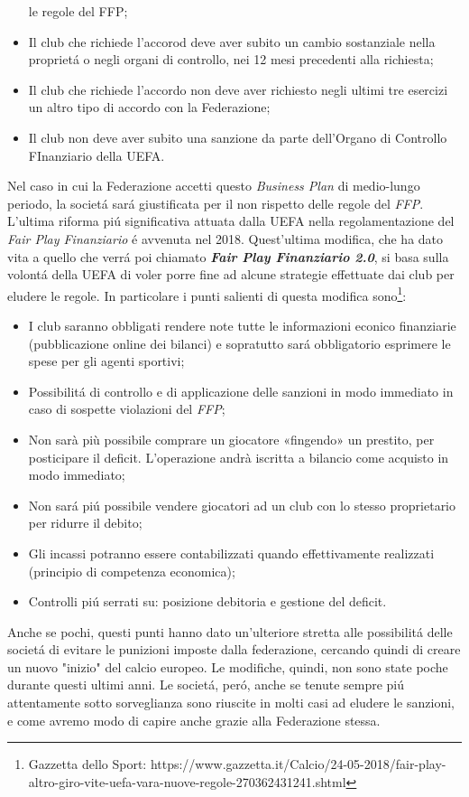 \documentclass[
    corpo=12pt,
    oneside,
    evenboxes,
    tipotesi=triennale,
    stile=classica,
    oldstyle,
    autoretitolo,
    greek,
]{toptesi}
\begin{document}
\begin{interlinea}{1.5}
\begin{itemize}
    le regole del FFP;
    \item Il club che richiede l'accorod deve aver subito un cambio sostanziale nella propriet\'a o negli organi di controllo, nei 12 mesi 
    precedenti alla richiesta;
    \item Il club che richiede l'accordo non deve aver richiesto negli ultimi tre esercizi un altro tipo di accordo con la Federazione;
    \item Il club non deve aver subito una sanzione da parte dell'Organo di Controllo FInanziario della UEFA.
\end{itemize}
Nel caso in cui la Federazione accetti questo \emph{Business Plan} di medio-lungo periodo, la societ\'a sar\'a giustificata per il non 
rispetto delle regole del \emph{FFP}.\newline
L'ultima riforma pi\'u significativa attuata dalla UEFA nella regolamentazione del \emph{Fair Play Finanziario} \'e avvenuta nel 2018.
Quest'ultima modifica, che ha dato vita a quello che verr\'a poi chiamato \emph{\textbf{Fair Play Finanziario 2.0}}, si basa sulla volont\'a della
UEFA di voler porre fine ad alcune strategie effettuate dai club per eludere le regole. In particolare i punti 
salienti di questa modifica sono\footnote{Gazzetta dello Sport: https://www.gazzetta.it/Calcio/24-05-2018/fair-play-altro-giro-vite-uefa-vara-nuove-regole-270362431241.shtml}:
\begin{itemize}
    \item I club saranno obbligati rendere note tutte le informazioni econico finanziarie (pubblicazione online dei bilanci) e 
    sopratutto sar\'a obbligatorio esprimere le spese per gli agenti sportivi;
    \item Possibilit\'a di controllo e di applicazione delle sanzioni in modo immediato in caso di sospette violazioni del \emph{FFP};
    \item Non sarà più possibile comprare un giocatore «fingendo» un prestito, per posticipare il deficit. L’operazione andrà iscritta 
    a bilancio come acquisto in modo immediato;
    \item Non sar\'a pi\'u possibile vendere giocatori ad un club con lo stesso proprietario per ridurre il debito;
    \item Gli incassi potranno essere contabilizzati quando effettivamente realizzati (principio di competenza economica);
    \item Controlli pi\'u serrati su: posizione debitoria e gestione del deficit.
\end{itemize}
Anche se pochi, questi punti hanno dato un'ulteriore stretta alle possibilit\'a delle societ\'a di evitare le punizioni imposte dalla federazione,
cercando quindi di creare un nuovo "inizio" del calcio europeo.\newline
Le modifiche, quindi, non sono state poche durante questi ultimi anni. Le societ\'a, per\'o, anche se tenute sempre pi\'u attentamente
sotto sorveglianza sono riuscite in molti casi ad eludere le sanzioni, e come avremo modo di capire anche grazie alla Federazione stessa.

\end{interlinea}
\end{document}
